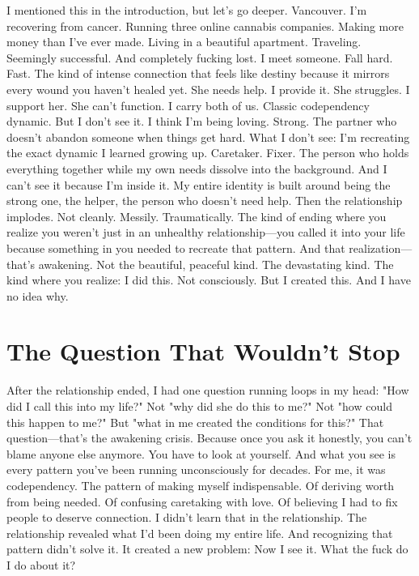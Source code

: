 \documentclass[12pt,openany]{book}
\begin{document}
I mentioned this in the introduction, but let's go deeper.
Vancouver. I'm recovering from cancer. Running three online cannabis companies. Making more money than I've ever made. Living in a beautiful apartment. Traveling. Seemingly successful.
And completely fucking lost.
I meet someone. Fall hard. Fast. The kind of intense connection that feels like destiny because it mirrors every wound you haven't healed yet.
She needs help. I provide it. She struggles. I support her. She can't function. I carry both of us.
Classic codependency dynamic.
But I don't see it. I think I'm being loving. Strong. The partner who doesn't abandon someone when things get hard.
What I don't see: I'm recreating the exact dynamic I learned growing up. Caretaker. Fixer. The person who holds everything together while my own needs dissolve into the background.
And I can't see it because I'm inside it. My entire identity is built around being the strong one, the helper, the person who doesn't need help.
Then the relationship implodes.
Not cleanly. Messily. Traumatically. The kind of ending where you realize you weren't just in an unhealthy relationship—you called it into your life because something in you needed to recreate that pattern.
And that realization—that's awakening.
Not the beautiful, peaceful kind. The devastating kind. The kind where you realize: I did this. Not consciously. But I created this. And I have no idea why.

\section{The Question That Wouldn't Stop}

After the relationship ended, I had one question running loops in my head:
"How did I call this into my life?"
Not "why did she do this to me?" Not "how could this happen to me?" But "what in me created the conditions for this?"
That question—that's the awakening crisis.
Because once you ask it honestly, you can't blame anyone else anymore. You have to look at yourself. And what you see is every pattern you've been running unconsciously for decades.
For me, it was codependency.
The pattern of making myself indispensable. Of deriving worth from being needed. Of confusing caretaking with love. Of believing I had to fix people to deserve connection.
I didn't learn that in the relationship. The relationship revealed what I'd been doing my entire life.
And recognizing that pattern didn't solve it. It created a new problem: Now I see it. What the fuck do I do about it?
\end{document}
